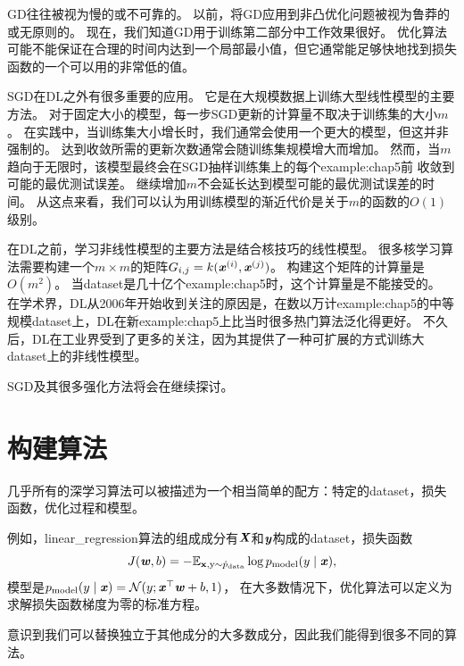 \gls{GD}往往被视为慢的或不可靠的。
以前，将\gls{GD}应用到非凸优化问题被视为鲁莽的或无原则的。
现在，我们知道\gls{GD}用于训练第二部分中工作效果很好。
优化算法可能不能保证在合理的时间内达到一个局部最小值，但它通常能足够快地找到损失函数的一个可以用的非常低的值。 


\gls{SGD}在\gls{DL}之外有很多重要的应用。
它是在大规模数据上训练大型线性模型的主要方法。
对于固定大小的模型，每一步\gls{SGD}更新的计算量不取决于训练集的大小$m$。
在实践中，当训练集大小增长时，我们通常会使用一个更大的模型，但这并非强制的。
达到收敛所需的更新次数通常会随训练集规模增大而增加。
然而，当$m$趋向于无限时，该模型最终会在\gls{SGD}抽样训练集上的每个\gls{example:chap5}前
收敛到可能的最优测试误差。
继续增加$m$不会延长达到模型可能的最优测试误差的时间。
从这点来看，我们可以认为用训练模型的渐近代价是关于$m$的函数的$O(1)$级别。

在\gls{DL}之前，学习非线性模型的主要方法是结合核技巧的线性模型。
很多核学习算法需要构建一个$m\times m$的矩阵$G_{i,j}=k(\boldsymbol{\mathit{x}}^{(i)}, \boldsymbol{\mathit{x}}^{(j)})$。
构建这个矩阵的计算量是$O(m^2)$。
当\gls{dataset}是几十亿个\gls{example:chap5}时，这个计算量是不能接受的。
在学术界，\gls{DL}从2006年开始收到关注的原因是，在数以万计\gls{example:chap5}的中等规模\gls{dataset}上，\gls{DL}在新\gls{example:chap5}上比当时很多热门算法泛化得更好。
不久后，\gls{DL}在工业界受到了更多的关注，因为其提供了一种可扩展的方式训练大\gls{dataset}上的非线性模型。

\gls{SGD}及其很多强化方法将会在继续探讨。

\section{构建算法}
\label{sec:building_a_machine_learning_algorithm}
几乎所有的深学习算法可以被描述为一个相当简单的配方：特定的\gls{dataset}，损失函数，优化过程和模型。

例如，\gls{linear_regression}算法的组成成分有$\boldsymbol{\mathit{X}}$和$\boldsymbol{\mathit{y}}$构成的\gls{dataset}，损失函数
\begin{equation}
    J(\boldsymbol{\mathit{w}}, b) = -\mathbb{E}_{\mathbf{x},\mathrm{y}\sim\hat{p}_{\text{data}}}
    \log p_{\text{model}} (y \mid \boldsymbol{\mathit{x}}) ,
\end{equation}
模型是$p_{\text{model}} (y \mid \boldsymbol{\mathit{x}}) = \mathcal{N}(y; \boldsymbol{\mathit{x}}^\top \boldsymbol{\mathit{w}} + b, 1)$，
在大多数情况下，优化算法可以定义为求解损失函数梯度为零的标准方程。

意识到我们可以替换独立于其他成分的大多数成分，因此我们能得到很多不同的算法。

